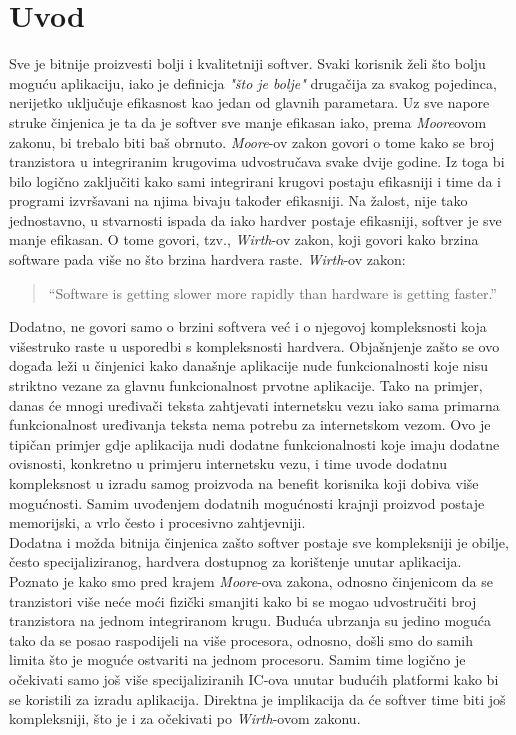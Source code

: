 \chapter{Uvod}

Sve je bitnije proizvesti bolji i kvalitetniji softver. Svaki korisnik želi što bolju moguću aplikaciju, iako je definicja \textit{"što je bolje"} drugačija za svakog pojedinca, nerijetko uključuje efikasnost kao jedan od glavnih parametara. Uz sve napore struke činjenica je ta da je softver sve manje efikasan iako, prema \textit{Moore}ovom zakonu\cite{mooresLaw}, bi trebalo biti baš obrnuto. \textit{Moore}-ov zakon govori o tome kako se broj tranzistora u integriranim krugovima udvostručava svake dvije godine. Iz toga bi bilo logično zaključiti kako sami integrirani krugovi postaju efikasniji i time da i programi izvršavani na njima bivaju također efikasniji. Na žalost, nije tako jednostavno, u stvarnosti ispada da iako hardver postaje efikasniji, softver je sve manje efikasan. O tome govori, tzv., \textit{Wirth}-ov zakon, koji govori kako brzina software pada više no što brzina hardvera raste. \textit{Wirth}-ov zakon:
\begin{quote}
    ``Software is getting slower more rapidly than hardware is getting faster.''\cite{wirthsLaw}
\end{quote}
Dodatno, ne govori samo o brzini softvera već i o njegovoj kompleksnosti koja višestruko raste u usporedbi s kompleksnosti hardvera. Objašnjenje zašto se ovo događa leži u činjenici kako današnje aplikacije nude funkcionalnosti koje nisu striktno vezane za glavnu funkcionalnost prvotne aplikacije. Tako na primjer, danas će mnogi uređivači teksta zahtjevati internetsku vezu iako sama primarna funkcionalnost uređivanja teksta nema potrebu za internetskom vezom. Ovo je tipičan primjer gdje aplikacija nudi dodatne funkcionalnosti koje imaju dodatne ovisnosti, konkretno u primjeru internetsku vezu, i time uvode dodatnu kompleksnost u izradu samog proizvoda na benefit korisnika koji dobiva više mogućnosti. Samim uvođenjem dodatnih mogućnosti krajnji proizvod postaje memorijski, a vrlo često i procesivno zahtjevniji. \\ 

Dodatna i možda bitnija činjenica zašto softver postaje sve kompleksniji je obilje, često specijaliziranog, hardvera dostupnog za korištenje unutar aplikacija. Poznato je kako smo pred krajem \textit{Moore}-ova zakona, odnosno činjenicom da se tranzistori više neće moći fizički smanjiti kako bi se mogao udvostručiti broj tranzistora na jednom integriranom krugu. Buduća ubrzanja su jedino moguća tako da se posao raspodijeli na više procesora, odnosno, došli smo do samih limita što je moguće ostvariti na jednom procesoru. Samim time logično je očekivati samo još više specijaliziranih IC-ova unutar budućih platformi kako bi se koristili za izradu aplikacija. Direktna je implikacija da će softver time biti još kompleksniji, što je i za očekivati po \textit{Wirth}-ovom zakonu. \\ 

